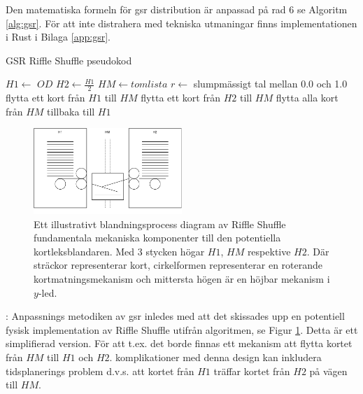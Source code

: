 \documentclass[swedish,a4paper]{article}
\begin{document}
Den matematiska formeln för \gls{gsr} distribution är anpassad på rad 6 se Algoritm
\ref{alg:gsr}. För att inte distrahera med tekniska utmaningar finns implementationen i
Rust i Bilaga \ref{app:gsr}.
\begin{algorithm}
\caption{GSR Riffle Shuffle pseudokod}
\label{alg:gsr}
\begin{algorithmic}[1]
\State $H1 \gets$ $OD$ 
\State $H2 \gets \frac{H1}{2}$ 
\State $HM \gets tom lista$ 
\State $r \gets$ slumpmässigt tal mellan 0.0 och 1.0 
        \State flytta ett kort från $H1$ till $HM$
    \Else
        \State flytta ett kort från $H2$ till $HM$
    \EndIf
\EndWhile
\State flytta alla kort från $HM$ tillbaka till $H1$
\end{algorithmic}
\end{algorithm}
\begin{figure}[H]
	\centering
	\includegraphics[width=0.5\textwidth]{irl_riffle_shuffle.pdf}
	\captionsetup{width=0.5\textwidth}
	\caption{Ett illustrativt blandningsprocess
		diagram av
	Riffle Shuffle fundamentala mekaniska komponenter till den potentiella
	kortleksblandaren. Med 3 stycken högar $H1$, $HM$ respektive $H2$. Där sträckor representerar kort,
	cirkelformen representerar en roterande kortmatningsmekanism och mittersta
	högen är en höjbar mekanism i $y$-led.}
	\label{fig:irl_gsr}
\end{figure}

: Anpassnings metodiken av
\gls{gsr} inledes med att det skissades upp en potentiell fysisk implementation av
Riffle Shuffle utifrån algoritmen, se Figur \ref{fig:irl_gsr}. Detta är ett
simplifierad version. För att t.ex. det borde finnas ett mekanism att flytta
kortet från $HM$ till $H1$ och $H2$. komplikationer med denna design kan inkludera
tidsplanerings problem d.v.s. att kortet från $H1$ träffar kortet från $H2$ på vägen
till $HM$.
\end{document}

